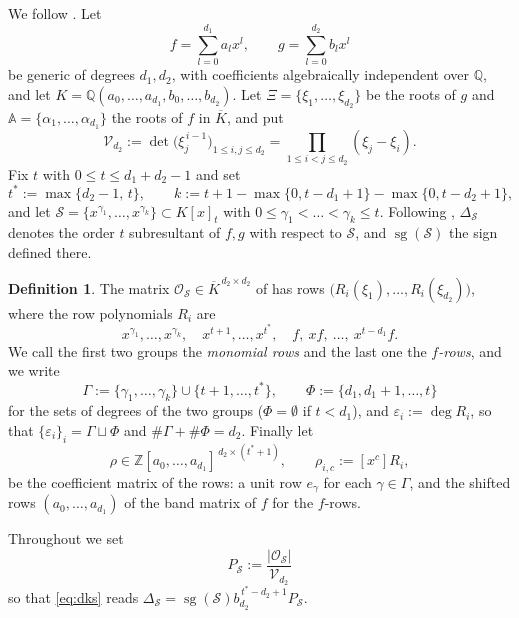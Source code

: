 \documentclass[11pt,reqno]{amsart}
\theoremstyle{plain}
\theoremstyle{definition}
\newtheorem{definition}[theorem]{Definition}
\DeclareMathOperator{\sg}{sg}
\newcommand{\bA}{\mathbb{A}}
\newcommand{\bX}{\Xi}
\newcommand{\cO}{\mathcal{O}}
\newcommand{\cS}{\mathcal{S}}
\newcommand{\cV}{\mathcal{V}}
\newcommand{\ZZ}{\mathbb{Z}}
\newcommand{\QQ}{\mathbb{Q}}
\begin{document}
We follow \cite[\S2]{DKS05}. Let
\[
  f=\sum_{l=0}^{d_1}a_lx^l,\qquad g=\sum_{l=0}^{d_2}b_lx^l
\]
be generic of degrees $d_1,d_2$, with coefficients algebraically independent over
$\QQ$, and let $K=\QQ(a_0,\dots,a_{d_1},b_0,\dots,b_{d_2})$. Let
$\bX=\{\xi_1,\dots,\xi_{d_2}\}$ be the roots of $g$ and
$\bA=\{\alpha_1,\dots,\alpha_{d_1}\}$ the roots of $f$ in $\overline K$, and put
\[
  \cV_{d_2}:=\det\big(\xi_j^{\,i-1}\big)_{1\le i,j\le d_2}
  =\prod_{1\le i<j\le d_2}(\xi_j-\xi_i).
\]
Fix $t$ with $0\le t\le d_1+d_2-1$ and set
\[
  t^*:=\max\{d_2-1,\,t\},\qquad
  k:=t+1-\max\{0,t-d_1+1\}-\max\{0,t-d_2+1\},
\]
and let $\cS=\{x^{\gamma_1},\dots,x^{\gamma_k}\}\subset K[x]_t$ with
$0\le\gamma_1<\dots<\gamma_k\le t$. Following \cite{DKS05}, $\Delta_\cS$ denotes
the order $t$ subresultant of $f,g$ with respect to $\cS$, and $\sg(\cS)$ the sign
defined there.

\begin{definition}\label{def:rows}
The matrix $\cO_\cS\in\overline K^{\,d_2\times d_2}$ of \cite[Thm.~2.2]{DKS05} has
rows $\big(R_i(\xi_1),\dots,R_i(\xi_{d_2})\big)$, where the row polynomials $R_i$
are
\[
  x^{\gamma_1},\dots,x^{\gamma_k},\quad
  x^{t+1},\dots,x^{t^*},\quad
  f,\ xf,\ \dots,\ x^{t-d_1}f .
\]
We call the first two groups the \emph{monomial rows} and the last one the
\emph{$f$-rows}, and we write
\[
  \Gamma:=\{\gamma_1,\dots,\gamma_k\}\cup\{t+1,\dots,t^*\},\qquad
  \Phi:=\{d_1,d_1+1,\dots,t\}
\]
for the sets of degrees of the two groups ($\Phi=\emptyset$ if $t<d_1$), and
$\varepsilon_i:=\deg R_i$, so that
$\{\varepsilon_i\}_i=\Gamma\sqcup\Phi$ and $\#\Gamma+\#\Phi=d_2$. Finally let
\[
  \rho\in\ZZ[a_0,\dots,a_{d_1}]^{\,d_2\times(t^*+1)},\qquad
  \rho_{i,c}:=[x^c]R_i ,
\]
be the coefficient matrix of the rows: a unit row $e_\gamma$ for each
$\gamma\in\Gamma$, and the shifted rows $(a_0,\dots,a_{d_1})$ of the band matrix
of $f$ for the $f$-rows.
\end{definition}

Throughout we set
\[
  \boxed{\;P_\cS:=\frac{|\cO_\cS|}{\cV_{d_2}}\;}
\]
so that \eqref{eq:dks} reads $\Delta_\cS=\sg(\cS)b_{d_2}^{\,t^*-d_2+1}P_\cS$.
\end{document}

